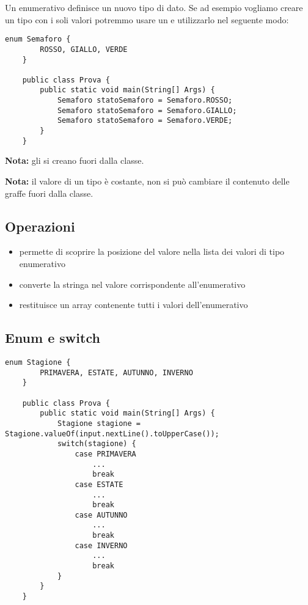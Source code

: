 \documentclass[../main.tex]{subfiles}
\begin{document}
Un enumerativo definisce un nuovo tipo di dato. Se ad esempio vogliamo creare un tipo  con i soli valori 
potremmo usare un  e utilizzarlo nel seguente modo:
\begin{lstlisting}[style=java]
    enum Semaforo {
        ROSSO, GIALLO, VERDE
    }

    public class Prova {
        public static void main(String[] Args) {
            Semaforo statoSemaforo = Semaforo.ROSSO;
            Semaforo statoSemaforo = Semaforo.GIALLO;
            Semaforo statoSemaforo = Semaforo.VERDE;
        }
    }
\end{lstlisting}
\textbf{Nota:} gli  si creano fuori dalla classe.

\textbf{Nota:} il valore di un tipo  è costante, non si può cambiare il contenuto delle graffe fuori dalla classe.

\subsection{Operazioni}
\begin{itemize}
    \item {} permette di scoprire la posizione del valore  nella lista dei valori di tipo enumerativo
    \item {} converte la stringa  nel valore corrispondente all'enumerativo 
    \item {} restituisce un array contenente tutti i valori dell'enumerativo 
\end{itemize}

\subsection{Enum e switch}
\begin{lstlisting}[style=java]
    enum Stagione {
        PRIMAVERA, ESTATE, AUTUNNO, INVERNO
    }

    public class Prova {
        public static void main(String[] Args) {
            Stagione stagione = Stagione.valueOf(input.nextLine().toUpperCase());
            switch(stagione) {
                case PRIMAVERA
                    ...
                    break
                case ESTATE
                    ...
                    break
                case AUTUNNO
                    ...
                    break
                case INVERNO
                    ...
                    break
            }
        }
    }
\end{lstlisting}
\end{document}
